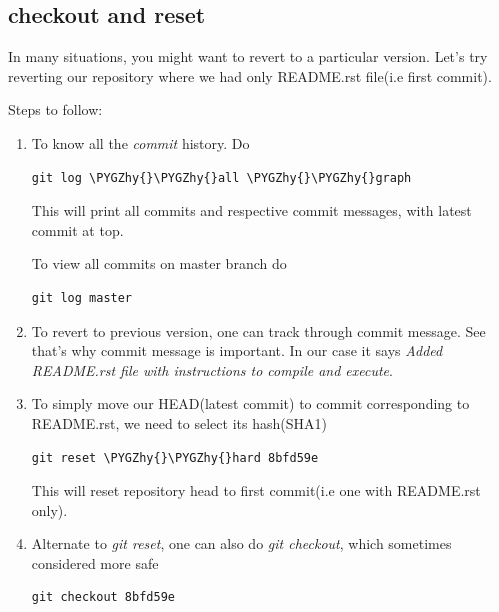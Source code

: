 \documentclass[letterpaper,10pt,english]{sphinxmanual}
\def\PYGZhy{\char`\-}
\begin{document}
\subsection{checkout and reset}
\label{version-control:checkout-and-reset}
In many situations, you might want to revert  to a particular version.
Let's try reverting our repository where we had only README.rst file(i.e
first commit).

Steps to follow:
\begin{enumerate}
\item {} 
To know all the \emph{commit} history. Do

\begin{Verbatim}[commandchars=\\\{\}]
git log \PYGZhy{}\PYGZhy{}all \PYGZhy{}\PYGZhy{}graph
\end{Verbatim}

This will print all commits and respective commit messages, with latest
commit at top.

To view all commits on master branch do

\begin{Verbatim}[commandchars=\\\{\}]
git log master
\end{Verbatim}

\item {} 
To revert to previous version, one can track through commit message. See that's
why commit message is important. In our case it says \emph{Added README.rst file
with instructions to compile and execute}.

\item {} 
To simply move our HEAD(latest commit) to commit corresponding to README.rst,
we need to select its hash(SHA1)

\begin{Verbatim}[commandchars=\\\{\}]
git reset \PYGZhy{}\PYGZhy{}hard 8bfd59e
\end{Verbatim}

This will reset repository head to first commit(i.e one with README.rst only).

\item {} 
Alternate to \emph{git reset}, one can also do \emph{git checkout}, which sometimes considered more safe

\begin{Verbatim}[commandchars=\\\{\}]
git checkout 8bfd59e
\end{Verbatim}


\end{enumerate}
\end{document}
